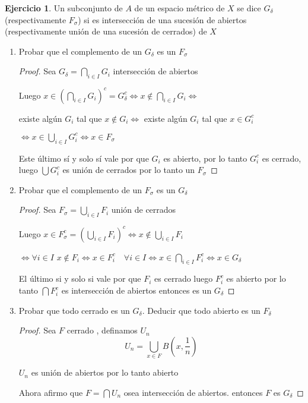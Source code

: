 \documentclass[11pt]{report}
\theoremstyle{definition}
\newtheorem{ej}{Ejercicio}
\begin{document}
\begin{ej}
Un subconjunto de $A$ de un espacio métrico de $X$ se dice $G_{\delta}$ (respectivamente $F_\sigma$) si es intersección de una sucesión de abiertos (respectivamente unión de una sucesión de cerrados) de $X$
\begin{enumerate}
  \item Probar que el complemento de un $ G_{\delta}$ es un $F_{\sigma}$
    \begin{proof}
    Sea $G_{\delta} = \bigcap_{i \in I} G_i$ intersección de abiertos

    Luego $x \in (\bigcap_{i \in I} G_i)^c = G_{\delta}^c \iff x \notin \bigcap_{i \in I}G_i \iff$

    existe algún $G_i$ tal que $x \notin G_i \iff$ existe algún $G_i$ tal que $ x \in G_{i}^c$

    $\iff x \in \bigcup_{i \in I} G_i^c \iff x \in F_{\sigma}$
 
    Este último sí y solo sí vale por que $G_i$ es abierto, por lo tanto $G_{i}^c$ es cerrado, luego $\bigcup G_i^c$ es unión de cerrados por lo tanto un $F_{\sigma}$
    \end{proof}
  \item Probar que el complemento de un $F_{\sigma}$ es un $G_{\delta}$
    \begin{proof}
      Sea $F_{\sigma} = \bigcup_{i \in I}F_i$ unión de cerrados 
      
      Luego $x \in F_{\sigma}^c = (\bigcup_{i \in I} F_i)^c \iff x \notin \bigcup_{i \in I} F_i$ 

      $\iff \forall i \in I$ $x \notin F_i \iff x \in F_i^c \quad \forall i \in I \iff x \in \bigcap_{i \in I} F_i^c \iff x \in G_{\delta}$  

      El último si y solo si vale por que  $F_i$ es cerrado luego $F_i^c$ es abierto por lo tanto $\bigcap F_{i}^c$ es intersección de abiertos entonces es un $G_{\delta}$

    \end{proof}
  \item Probar que todo cerrado es un $G_{\delta}$. Deducir que todo abierto es un $F_{\delta}$
\begin{proof}

  Sea $F$ cerrado , definamos $U_n$ $$U_n = \bigcup_{x \in F} B(x,\frac{1}{n})$$

  $U_n$ es unión de abiertos por lo tanto abierto

  Ahora afirmo que $F = \bigcap U_n$ osea intersección de abiertos. entonces $F$ es $G_{\delta}$


\end{proof}
\end{enumerate}
\end{ej}
\end{document}
